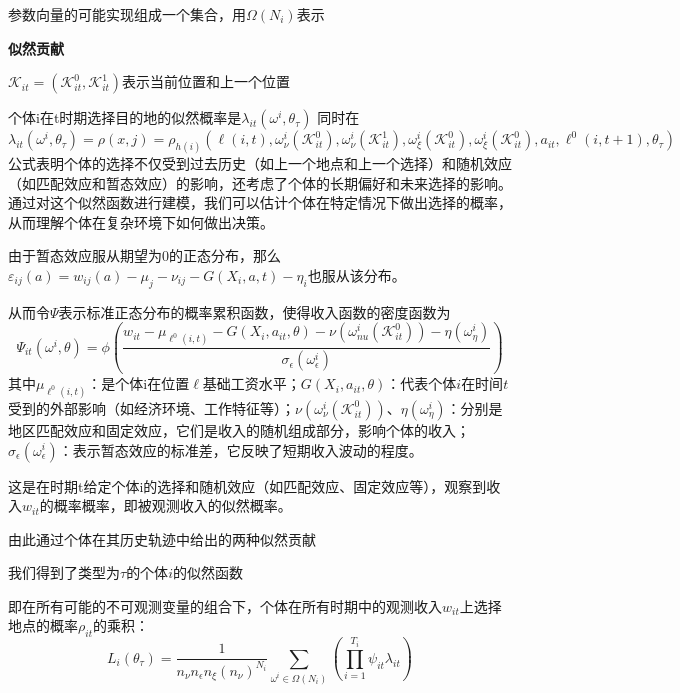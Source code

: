 \documentclass[10pt,a4paper]{article}
\begin{document}
参数向量的可能实现组成一个集合，用$\Omega(N_{i})$表示

\textbf{似然贡献}

$\mathcal{K}_{it}=(\mathcal{K}_{it}^{0},\mathcal{K}_{it}^{1})$表示当前位置和上一个位置

个体i在t时期选择目的地的似然概率是$\lambda_{it}(\omega^{i},\theta_{\tau})$
同时在
\begin{equation}
  \lambda_{it}(\omega^{i},\theta_{\tau})=\rho(x,j)=\rho_{h(i)}(\ell(i,t),\omega_{\nu}^{i}(\mathcal{K}_{it}^{0}),\omega_{\nu}^{i}(\mathcal{K}_{it}^{1}),\omega_{\xi}^{i}(\mathcal{K}_{it}^{0}),\omega_{\xi}^{i}(\mathcal{K}_{it}^{0}),a_{it},\ell^{0}(i,t+1),\theta_{\tau})
\end{equation}
公式表明个体的选择不仅受到过去历史（如上一个地点和上一个选择）和随机效应（如匹配效应和暂态效应）的影响，还考虑了个体的长期偏好和未来选择的影响。
通过对这个似然函数进行建模，我们可以估计个体在特定情况下做出选择的概率，从而理解个体在复杂环境下如何做出决策。


由于暂态效应服从期望为0的正态分布，那么$\varepsilon_{ij}(a)=w_{ij}(a)-\mu_j-\nu_{ij}-G(X_i,a,t)-\eta_i$也服从该分布。

从而令$\Psi$表示标准正态分布的概率累积函数，使得收入函数的密度函数为
\begin{equation}
  \Psi_{it}(\omega^{i},\theta)=\phi(\frac{w_{it} - \mu_{\ell^{0}(i,t)}-G(X_{i},a_{it},\theta)-\nu(\omega_{nu}^{i}(\mathcal{K}_{it}^{0}))-\eta(\omega_{\eta}^{i})  }{\sigma_{\epsilon}(\omega_{\epsilon}^{i})})
\end{equation}
其中$\mu_{\ell^{0}(i,t)}$：是个体i在位置$\ell$基础工资水平；$G(X_i, a_{it}, \theta)$：代表个体$i$在时间$t$受到的外部影响（如经济环境、工作特征等）；$\nu(\omega_{\nu}^i(\mathcal{K}_{it}^0))$、$\eta(\omega_{\eta}^i)$：分别是地区匹配效应和固定效应，它们是收入的随机组成部分，影响个体的收入；$\sigma_{\epsilon}(\omega_{\epsilon}^i)$：表示暂态效应的标准差，它反映了短期收入波动的程度。

这是在时期t给定个体i的选择和随机效应（如匹配效应、固定效应等），观察到收入$w_{it}$的概率概率，即被观测收入的似然概率。

由此通过个体在其历史轨迹中给出的两种似然贡献

我们得到了类型为$\tau$的个体$i$的似然函数

即在所有可能的不可观测变量的组合下，个体在所有时期中的观测收入$w_{it}$上选择地点的概率$\rho_{it}$的乘积：
\begin{equation}
  L_{i}(\theta_{\tau})=\frac{1}{n_{\nu}n_{\epsilon}n_{\xi}(n_{\nu})^{N_{i}}} \sum\limits_{\omega^{i}\in\Omega(N_{i})}(\prod\limits_{i=1}^{T_{i}} \psi_{it}\lambda_{it})
\end{equation}
\end{document}
